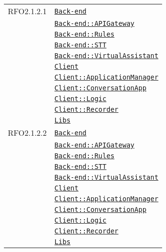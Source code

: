 \begin{longtable}{|>{\centering}m{3cm}|m{10cm}<{\centering}|}
RFO2.1.2.1 & \hyperref[Back-end]{\texttt{Back-end}}\\
& \hyperref[Back-end::APIGateway]{\texttt{Back-end::APIGateway}}\\
& \hyperref[Back-end::Rules]{\texttt{Back-end::Rules}}\\
& \hyperref[Back-end::STT]{\texttt{Back-end::STT}}\\
& \hyperref[Back-end::VirtualAssistant]{\texttt{Back-end::VirtualAssistant}}\\
& \hyperref[Client]{\texttt{Client}}\\
& \hyperref[Client::ApplicationManager]{\texttt{Client::ApplicationManager}}\\
& \hyperref[Client::ConversationApp]{\texttt{Client::ConversationApp}}\\
& \hyperref[Client::Logic]{\texttt{Client::Logic}}\\
& \hyperref[Client::Recorder]{\texttt{Client::Recorder}}\\
& \hyperref[Libs]{\texttt{Libs}}\\ \hline

RFO2.1.2.2 & \hyperref[Back-end]{\texttt{Back-end}}\\
& \hyperref[Back-end::APIGateway]{\texttt{Back-end::APIGateway}}\\
& \hyperref[Back-end::Rules]{\texttt{Back-end::Rules}}\\
& \hyperref[Back-end::STT]{\texttt{Back-end::STT}}\\
& \hyperref[Back-end::VirtualAssistant]{\texttt{Back-end::VirtualAssistant}}\\
& \hyperref[Client]{\texttt{Client}}\\
& \hyperref[Client::ApplicationManager]{\texttt{Client::ApplicationManager}}\\
& \hyperref[Client::ConversationApp]{\texttt{Client::ConversationApp}}\\
& \hyperref[Client::Logic]{\texttt{Client::Logic}}\\
& \hyperref[Client::Recorder]{\texttt{Client::Recorder}}\\
& \hyperref[Libs]{\texttt{Libs}}\\ \hline


\end{longtable}

